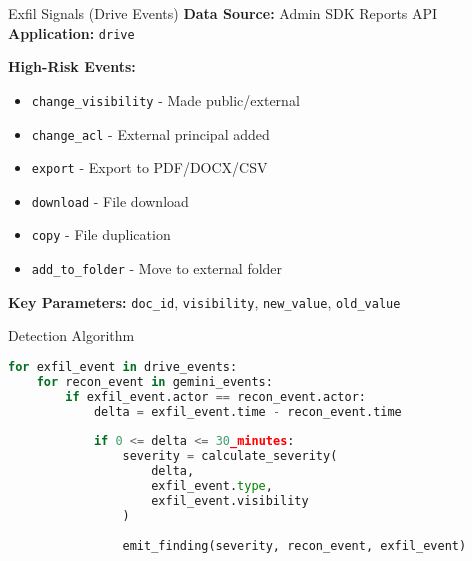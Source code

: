 \documentclass[aspectratio=169]{beamer}
\begin{document}
\begin{frame}{Exfil Signals (Drive Events)}
\textbf{Data Source:} Admin SDK Reports API \\
\textbf{Application:} \texttt{drive}

\vspace{1em}

\textbf{High-Risk Events:}
\begin{itemize}
    \item \texttt{change\_visibility} - Made public/external
    \item \texttt{change\_acl} - External principal added
    \item \texttt{export} - Export to PDF/DOCX/CSV
    \item \texttt{download} - File download
    \item \texttt{copy} - File duplication
    \item \texttt{add\_to\_folder} - Move to external folder
\end{itemize}

\vspace{1em}

\textbf{Key Parameters:} \texttt{doc\_id}, \texttt{visibility}, \texttt{new\_value}, \texttt{old\_value}
\end{frame}

\begin{frame}[fragile]{Detection Algorithm}
\begin{lstlisting}[language=Python]
for exfil_event in drive_events:
    for recon_event in gemini_events:
        if exfil_event.actor == recon_event.actor:
            delta = exfil_event.time - recon_event.time
            
            if 0 <= delta <= 30_minutes:
                severity = calculate_severity(
                    delta, 
                    exfil_event.type,
                    exfil_event.visibility
                )
                
                emit_finding(severity, recon_event, exfil_event)
\end{lstlisting}
\end{frame}
\end{document}
